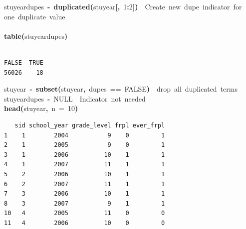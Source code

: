 \documentclass[12pt]{article}
\makeatletter
\newcommand{\hlnumber}[1]{\textcolor[rgb]{0,0,0}{#1}}%
\newcommand{\hlfunctioncall}[1]{\textcolor[rgb]{0.501960784313725,0,0.329411764705882}{\textbf{#1}}}%
\newcommand{\hlkeyword}[1]{\textcolor[rgb]{0,0,0}{\textbf{#1}}}%
\newcommand{\hlargument}[1]{\textcolor[rgb]{0.690196078431373,0.250980392156863,0.0196078431372549}{#1}}%
\newcommand{\hlcomment}[1]{\textcolor[rgb]{0.180392156862745,0.6,0.341176470588235}{#1}}%
\newcommand{\hlassignement}[1]{\textcolor[rgb]{0,0,0}{\textbf{#1}}}%
\newcommand{\hlsymbol}[1]{\textcolor[rgb]{0,0,0}{#1}}%
\newcommand{\hlstd}[1]{\textcolor[rgb]{0,0,0}{#1}}%
\newenvironment{kframe}{%
 \def\FrameCommand##1{\hskip\@totalleftmargin \hskip-\fboxsep
 \colorbox{shadecolor}{##1}\hskip-\fboxsep
     \hskip-\linewidth \hskip-\@totalleftmargin \hskip\columnwidth}%
 \MakeFramed {\advance\hsize-\width
   \@totalleftmargin\z@ \linewidth\hsize
   \@setminipage}}%
 {\par\unskip\endMakeFramed}
\newenvironment{knitrout}{}{} %
\renewenvironment{knitrout}{\begin{footnotesize}}{\end{footnotesize}}
\makeatother
\begin{document}
\begin{knitrout}
\color{fgcolor}\begin{kframe}
\begin{flushleft}
\ttfamily\noindent
\hlsymbol{stuyear}\hlkeyword{\usebox{\hlnormalsizeboxdollar}}\hlsymbol{dupes}{\ }\hlassignement{\usebox{\hlnormalsizeboxlessthan}-}{\ }\hlfunctioncall{duplicated}\hlkeyword{(}\hlsymbol{stuyear}\hlkeyword{[}\hlkeyword{,}{\ }\hlnumber{1}\hlkeyword{:}\hlnumber{2}\hlkeyword{]}\hlkeyword{)}{\ }{\ }\hlcomment{\usebox{\hlnormalsizeboxhash}{\ }Create{\ }new{\ }dupe{\ }indicator{\ }for}\hspace*{\fill}\\
\hlstd{}\hlcomment{\usebox{\hlnormalsizeboxhash}{\ }one{\ }duplicate{\ }value}\hspace*{\fill}\\
\hlstd{}\hspace*{\fill}\\
\hlstd{}\hlfunctioncall{table}\hlkeyword{(}\hlsymbol{stuyear}\hlkeyword{\usebox{\hlnormalsizeboxdollar}}\hlsymbol{dupes}\hlkeyword{)}\mbox{}
\normalfont
\end{flushleft}
\begin{verbatim}

FALSE  TRUE 
56026    18 
\end{verbatim}
\begin{flushleft}
\ttfamily\noindent
\hlsymbol{stuyear}{\ }\hlassignement{\usebox{\hlnormalsizeboxlessthan}-}{\ }\hlfunctioncall{subset}\hlkeyword{(}\hlsymbol{stuyear}\hlkeyword{,}{\ }\hlsymbol{dupes}{\ }=={\ }\hlnumber{FALSE}\hlkeyword{)}{\ }{\ }\hlcomment{\usebox{\hlnormalsizeboxhash}{\ }drop{\ }all{\ }duplicated{\ }terms}\hspace*{\fill}\\
\hlstd{}\hlsymbol{stuyear}\hlkeyword{\usebox{\hlnormalsizeboxdollar}}\hlsymbol{dupes}{\ }\hlassignement{\usebox{\hlnormalsizeboxlessthan}-}{\ }NULL{\ }{\ }\hlcomment{\usebox{\hlnormalsizeboxhash}{\ }Indicator{\ }not{\ }needed}\hspace*{\fill}\\
\hlstd{}\hlfunctioncall{head}\hlkeyword{(}\hlsymbol{stuyear}\hlkeyword{,}{\ }\hlargument{n}{\ }\hlargument{=}{\ }\hlnumber{10}\hlkeyword{)}\mbox{}
\normalfont
\end{flushleft}
\begin{verbatim}
   sid school_year grade_level frpl ever_frpl
1    1        2004           9    0         1
2    1        2005           9    0         1
3    1        2006          10    1         1
4    1        2007          11    1         1
5    2        2006          10    1         1
6    2        2007          11    1         1
7    3        2006          10    1         1
8    3        2007           9    1         1
10   4        2005          11    0         0
11   4        2006          10    0         0
\end{verbatim}
\end{kframe}
\end{knitrout}
\end{document}

